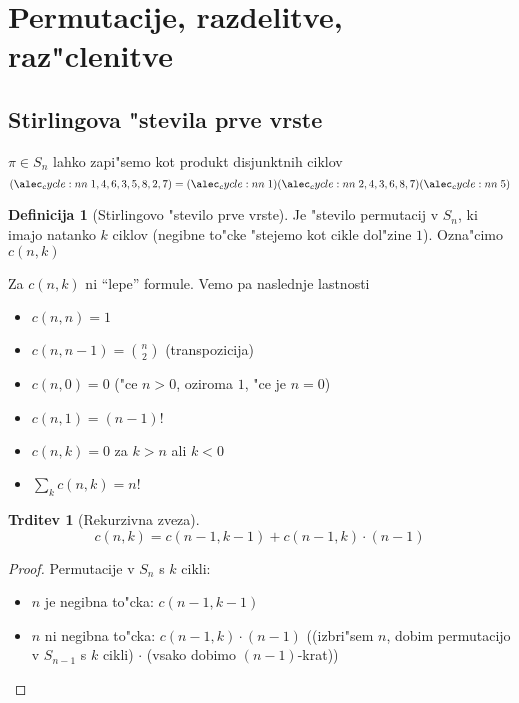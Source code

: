 \documentclass[a4paper,12pt]{article}
\theoremstyle{definition}
\newtheorem{defn}[counter]{Definicija}
\newtheorem{claim}[counter]{Trditev}
\theoremstyle{remark}
\begin{document}
\section{Permutacije, razdelitve, raz"clenitve}
\subsection{Stirlingova "stevila prve vrste}
$\pi \in S_n$ lahko zapi"semo kot produkt disjunktnih ciklov
\[\cycle{1, 4, 6, 3, 5, 8, 2, 7} = \cycle{1}\cycle{2, 4, 3, 6, 8, 7}\cycle{5}\]

\begin{defn}[Stirlingovo "stevilo prve vrste]
	Je "stevilo permutacij v $S_n$, ki imajo natanko $k$ ciklov (negibne to"cke "stejemo kot cikle dol"zine $1$). Ozna"cimo $c(n, k)$
\end{defn}
Za $c(n, k)$ ni ``lepe'' formule. Vemo pa naslednje lastnosti
\begin{itemize}
	\item $c(n, n) = 1$
	\item $c (n, n-1) = \binom{n}{2}$ (transpozicija)
	\item $c(n, 0) = 0$ ("ce $n > 0$, oziroma $1$, "ce je $n = 0$)
	\item $c(n, 1) = (n-1)!$
	\item $c(n, k) = 0$ za $k > n$ ali $k < 0$
	\item $\sum_k c(n, k) = n!$	
\end{itemize}

\begin{claim}[Rekurzivna zveza]
	\[c(n, k) = c(n-1, k-1) + c(n-1, k)\cdot(n-1)\]
\end{claim}

\begin{proof}
	Permutacije v $S_n$ s $k$ cikli:
	\begin{itemize}
	    \item $n$ je negibna to"cka: $c(n-1, k-1)$
	    \item $n$ ni negibna to"cka: $c(n-1, k)  \cdot (n-1)$ ((izbri"sem $n$, dobim permutacijo v $S_{n-1}$ s $k$ cikli) $\cdot$ (vsako dobimo $(n-1)$-krat))
	\end{itemize}
\end{proof}
\end{document}
